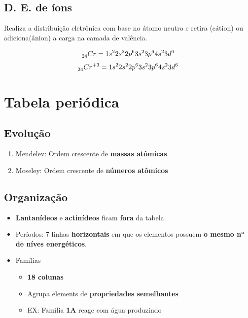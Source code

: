 \documentclass{article}
\begin{document}
\subsection{D. E. de íons}
Realiza a distribuição eletrônica com base no átomo neutro e retira (cátion) ou adiciona(ânion) a carga na camada de valência.

\begin{equation}
    \prescript{}{24}{Cr} = 1s^2 2s^2 2p^6 3s^2 3p^6 4s^2 3d^6
\end{equation}
\begin{equation}
    \prescript{}{24}{Cr}^{+3} = 1s^2 2s^2 2p^6 3s^2 3p^6 4s^2 3d^6
\end{equation}

\section{Tabela periódica}

\subsection{Evolução}
\begin{enumerate}
    \item Mendelev: Ordem crescente de \textbf{massas atômicas}
    \item Moseley: Ordem crescente de \textbf{números atômicos}
\end{enumerate}

\subsection{Organização}

\begin{itemize}
    \item \textbf{Lantanídeos} e \textbf{actinídeos } ficam \textbf{fora} da tabela.
    \item Períodos: 7 linhas \textbf{horizontais} em que os elementos possuem \textbf{o mesmo n° de níves energéticos}.
    \item Famílias
    \begin{itemize}
        \item \textbf{18 colunas}
        \item Agrupa elements de \textbf{propriedades semelhantes}
        \item EX: Família \textbf{1A} reage com água produzindo 
    \end{itemize}
\end{itemize}
\end{document}

